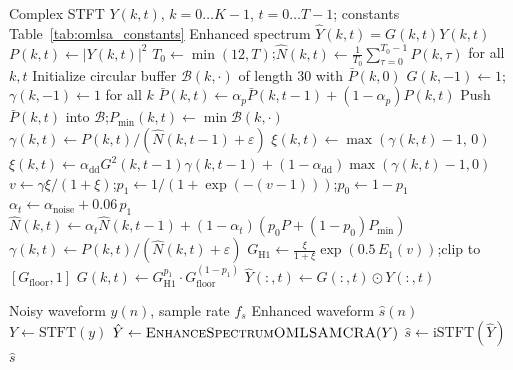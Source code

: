 \begin{algorithm}[H]
  \caption{Full OM-LSA/MCRA spectral enhancement (\texttt{enhance\_spectrum\_omlsa\_mcra})}
  \label{alg:omlsa_mcra_full}
  \begin{algorithmic}[1]
    \Require Complex STFT $Y(k,t)$, $k=0\ldots K-1$, $t=0\ldots T-1$; constants Table~\ref{tab:omlsa_constants}
    \Ensure Enhanced spectrum $\hat{Y}(k,t)=G(k,t)Y(k,t)$
    \State $P(k,t) \gets |Y(k,t)|^2$
    \State $T_0 \gets \min(12, T)$;\quad $\hat{N}(k,t) \gets \frac{1}{T_0}\sum_{\tau=0}^{T_0-1} P(k,\tau)$ for all $k,t$ 
    \State Initialize circular buffer $\mathcal{B}(k,\cdot)$ of length 30 with $\bar{P}(k,0)$
    \State $G(k,-1)\gets 1$;\quad $\gamma(k,-1)\gets 1$ for all $k$
        \State $\bar{P}(k,t) \gets \alpha_p \bar{P}(k,t{-}1) + (1-\alpha_p) P(k,t)$
        \State Push $\bar{P}(k,t)$ into $\mathcal{B}$;\quad $P_{\min}(k,t) \gets \min \mathcal{B}(k,\cdot)$
      \EndFor
        \State $\gamma(k,t) \gets P(k,t) / (\hat{N}(k,t{-}1) + \varepsilon)$
          \State $\xi(k,t) \gets \max(\gamma(k,t)-1,\, 0)$
        \Else
          \State $\xi(k,t) \gets \alpha_{\mathrm{dd}} G^2(k,t{-}1)\gamma(k,t{-}1) + (1-\alpha_{\mathrm{dd}})\max(\gamma(k,t)-1,0)$
        \EndIf
        \State $v \gets \gamma\xi/(1+\xi)$;\quad $p_1 \gets 1/(1+\exp(-(v-1)))$;\quad $p_0 \gets 1-p_1$
        \State $\alpha_t \gets \alpha_{\mathrm{noise}} + 0.06\, p_1$
        \State $\hat{N}(k,t) \gets \alpha_t \hat{N}(k,t{-}1) + (1-\alpha_t)(p_0 P + (1-p_0)P_{\min})$
        \State $\gamma(k,t) \gets P(k,t)/(\hat{N}(k,t)+\varepsilon)$
        \State $G_{\mathrm{H1}} \gets \frac{\xi}{1+\xi}\exp(0.5\,E_1(v))$;\quad clip to $[G_{\mathrm{floor}},1]$
        \State $G(k,t) \gets G_{\mathrm{H1}}^{p_1} \cdot G_{\mathrm{floor}}^{(1-p_1)}$
      \EndFor
      \State $\hat{Y}(:,t) \gets G(:,t) \odot Y(:,t)$
    \EndFor
  \end{algorithmic}
\end{algorithm}

\begin{algorithm}[H]
  \caption{Time-domain wrapper \texttt{base\_omlsa\_mcra.process}}
  \label{alg:omlsa_process}
  \begin{algorithmic}[1]
    \Require Noisy waveform $y(n)$, sample rate $f_s$
    \Ensure Enhanced waveform $\hat{s}(n)$
    \State $Y \gets \mathrm{STFT}(y)$ 
    \State $\hat{Y} \gets \textsc{EnhanceSpectrumOMLSAMCRA}(Y)$
    \State $\hat{s} \gets \mathrm{iSTFT}(\hat{Y})$ 
    \State \Return $\hat{s}$
  \end{algorithmic}
\end{algorithm}

